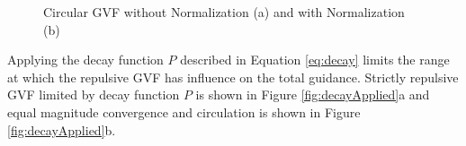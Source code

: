 \documentclass[numbered,pdftex]{ohio-etd}
\begin{document}
\begin{figure}[H]
	\begin{subfigmatrix}{2}%
		\centering	
		\hspace*{0mm}
	\end{subfigmatrix}
	\caption{Circular GVF without Normalization (a) and with Normalization (b)}
	\label{fig:gvfCircCirculation}
\end{figure}

Applying the decay function $P$ described in Equation \ref{eq:decay} limits the range at which the repulsive GVF has influence on the total guidance. Strictly repulsive GVF limited by decay function $P$ is shown in Figure \ref{fig:decayApplied}a and equal magnitude convergence and circulation is shown in Figure \ref{fig:decayApplied}b.
\end{document}
